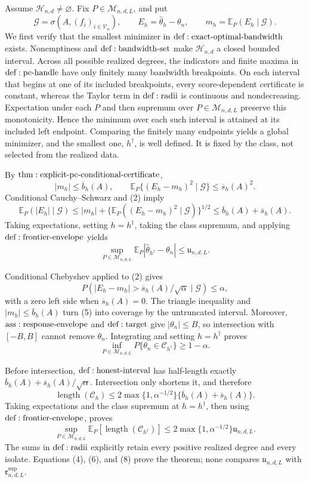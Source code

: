 Assume \(\mathcal H_{n,d}\ne\varnothing\).  Fix \(P\in\mathcal M_{n,d,L}\), and put
\[
 \mathcal G=\sigma\!\left(A,(f_i)_{i\in\mathcal V_n}\right),
 \qquad E_h=\widehat\theta_h-\theta_n,
 \qquad m_h=\mathbb E_P(E_h\mid\mathcal G).
\tag{1}
\]
We first verify that the smallest minimizer in \({\rm def:exact\text{-}optimal\text{-}bandwidth}\) exists.  Nonemptiness and \({\rm def:bandwidth\text{-}set}\) make \(\mathcal H_{n,d}\) a closed bounded interval.  Across all possible realized degrees, the indicators and finite maxima in \({\rm def:pc\text{-}handle}\) have only finitely many bandwidth breakpoints.  On each interval that begins at one of its included breakpoints, every score-dependent certificate is constant, whereas the Taylor term in \({\rm def:radii}\) is continuous and nondecreasing.  Expectation under each \(P\) and then supremum over \(P\in\mathcal M_{n,d,L}\) preserve this monotonicity.  Hence the minimum over each such interval is attained at its included left endpoint.  Comparing the finitely many endpoints yields a global minimizer, and the smallest one, \(h^\dagger\), is well defined.  It is fixed by the class, not selected from the realized data.

By \({\rm thm:explicit\text{-}pc\text{-}conditional\text{-}certificate}\),
\[
 |m_h|\leq\overline b_h(A),
 \qquad
 \mathbb E_P\{(E_h-m_h)^2\mid\mathcal G\}\leq\overline s_h(A)^2.
\tag{2}
\]
Conditional Cauchy--Schwarz and (2) imply
\[
 \mathbb E_P(|E_h|\mid\mathcal G)
 \leq |m_h|+\{\mathbb E_P((E_h-m_h)^2\mid\mathcal G)\}^{1/2}
 \leq\overline b_h(A)+\overline s_h(A).
\tag{3}
\]
Taking expectations, setting \(h=h^\dagger\), taking the class supremum, and applying \({\rm def:frontier\text{-}envelope}\) yields
\[
 \sup_{P\in\mathcal M_{n,d,L}}
 \mathbb E_P|\widehat\theta_{h^\dagger}-\theta_n|
 \leq\mathfrak u_{n,d,L}.
\tag{4}
\]

Conditional Chebyshev applied to (2) gives
\[
 P\!\left(|E_h-m_h|>\overline s_h(A)/\sqrt\alpha\mid\mathcal G\right)\leq\alpha,
\tag{5}
\]
with a zero left side when \(\overline s_h(A)=0\).  The triangle inequality and \(|m_h|\leq\overline b_h(A)\) turn (5) into coverage by the untruncated interval.  Moreover, \({\rm ass:response\text{-}envelope}\) and \({\rm def:target}\) give \(|\theta_n|\leq B\), so intersection with \([-B,B]\) cannot remove \(\theta_n\).  Integrating and setting \(h=h^\dagger\) proves
\[
 \inf_{P\in\mathcal M_{n,d,L}}P\{\theta_n\in\mathcal C_{h^\dagger}\}\geq1-\alpha.
\tag{6}
\]

Before intersection, \({\rm def:honest\text{-}interval}\) has half-length exactly \(\overline b_h(A)+\overline s_h(A)/\sqrt\alpha\).  Intersection only shortens it, and therefore
\[
 \operatorname{length}(\mathcal C_h)
 \leq2\max\{1,\alpha^{-1/2}\}\{\overline b_h(A)+\overline s_h(A)\}.
\tag{7}
\]
Taking expectations and the class supremum at \(h=h^\dagger\), then using \({\rm def:frontier\text{-}envelope}\), proves
\[
 \sup_{P\in\mathcal M_{n,d,L}}
 \mathbb E_P[\operatorname{length}(\mathcal C_{h^\dagger})]
 \leq2\max\{1,\alpha^{-1/2}\}\mathfrak u_{n,d,L}.
\tag{8}
\]
The sums in \({\rm def:radii}\) explicitly retain every positive realized degree and every isolate.  Equations (4), (6), and (8) prove the theorem; none compares \(\mathfrak u_{n,d,L}\) with \(\mathfrak r^{\mathrm{sup}}_{n,d,L}\).